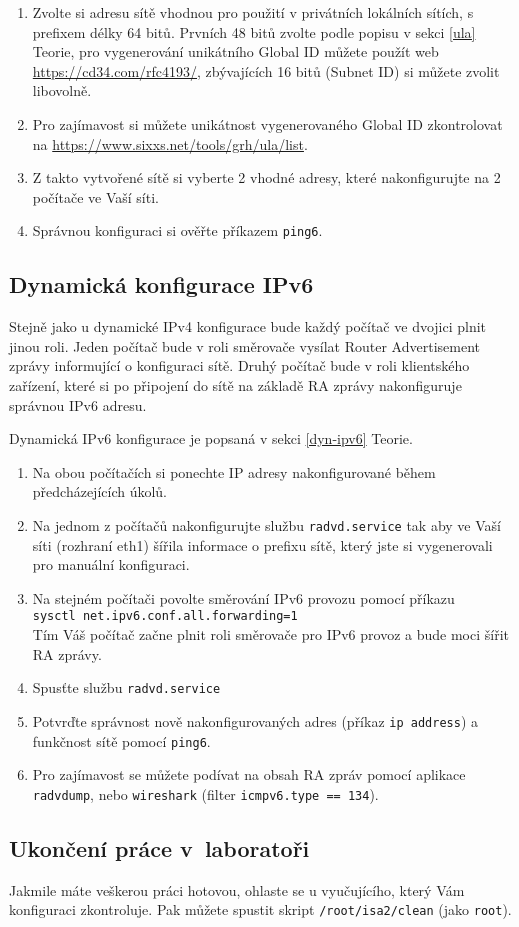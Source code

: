 \begin{enumerate}
    \item Zvolte si adresu sítě vhodnou pro použití v privátních lokálních
        sítích, s prefixem délky 64 bitů. Prvních 48 bitů zvolte podle popisu v
        sekci \ref{ula} Teorie, pro vygenerování unikátního Global ID můžete
        použít web \url{https://cd34.com/rfc4193/}, zbývajících 16 bitů (Subnet
        ID) si můžete zvolit libovolně.
    \item Pro zajímavost si můžete unikátnost vygenerovaného Global ID
        zkontrolovat na \url{https://www.sixxs.net/tools/grh/ula/list}.
    \item Z takto vytvořené sítě si vyberte 2 vhodné adresy, které
        nakonfigurujte na 2 počítače ve Vaší síti.
    \item Správnou konfiguraci si ověřte příkazem {\tt ping6}.
\end{enumerate}

\subsection{Dynamická konfigurace IPv6}
Stejně jako u dynamické IPv4 konfigurace bude každý počítač ve dvojici plnit
jinou roli. Jeden počítač bude v roli směrovače vysílat Router Advertisement
zprávy informující o konfiguraci sítě. Druhý počítač bude v roli klientského
zařízení, které si po připojení do sítě na základě RA zprávy nakonfiguruje
správnou IPv6 adresu.

Dynamická IPv6 konfigurace je popsaná v sekci \ref{dyn-ipv6} Teorie.

\begin{enumerate}
    \item Na obou počítačích si ponechte IP adresy nakonfigurované během
        předcházejících úkolů.
    \item Na jednom z počítačů nakonfigurujte službu \texttt{radvd.service} tak
        aby ve Vaší síti (rozhraní eth1) šířila informace o prefixu sítě, který
        jste si vygenerovali pro manuální konfiguraci.
    \item Na stejném počítači povolte směrování IPv6 provozu pomocí příkazu\\
        \texttt{sysctl net.ipv6.conf.all.forwarding=1}\\
        Tím Váš počítač začne plnit roli směrovače pro IPv6 provoz a bude moci
        šířit RA zprávy.
    \item Spusťte službu \texttt{radvd.service}
    \item Potvrďte správnost nově nakonfigurovaných adres (příkaz \texttt{ip
        address}) a funkčnost sítě pomocí \texttt{ping6}.
    \item Pro zajímavost se můžete podívat na obsah RA zpráv pomocí aplikace
        \texttt{radvdump}, nebo \texttt{wireshark} (filter \texttt{icmpv6.type
        == 134}).
\end{enumerate}

\subsection{Ukončení práce v~laboratoři}
Jakmile máte veškerou práci hotovou, ohlaste se u vyučujícího, který Vám
konfiguraci zkontroluje. Pak můžete spustit skript {\tt /root/isa2/clean} (jako
\texttt{root}).
